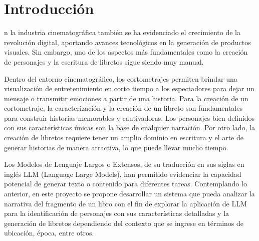 \documentclass[journal,onecolumn]{IEEEtran}
\begin{document}
	\section{Introducción}
	n la industria cinematográfica también se ha evidenciado el crecimiento de la revolución digital, aportando avances tecnológicos en la generación de productos visuales. Sin embargo, uno de los aspectos más fundamentales como la creación de personajes y la escritura de libretos sigue siendo muy manual.
	
	Dentro del entorno cinematográfico, los cortometrajes permiten brindar una visualización de entretenimiento en corto tiempo a los espectadores para dejar un mensaje o transmitir emociones a partir de una historia. Para la creación de un cortometraje, la caracterización y la creación de un libreto son fundamentales para construir historias memorables y cautivadoras. Los personajes bien definidos con sus características únicas son la base de cualquier narración. Por otro lado, la creación de libretos requiere tener un amplio dominio en escritura y el arte de generar historias de manera atractiva, lo que puede llevar mucho tiempo.
	
	Los Modelos de Lenguaje Largos o Extensos, de su traducción en sus siglas en inglés LLM (Language Large Models), han permitido evidenciar la capacidad potencial de generar texto o contenido para diferentes tareas. Contemplando lo anterior, en este proyecto se propone desarrollar un sistema que pueda analizar la narrativa del fragmento de un libro con el fin de explorar la aplicación de LLM para la identificación de personajes con sus características detalladas y la generación de libretos dependiendo del contexto que se ingrese en términos de ubicación, época, entre otros.
	
	
\end{document}
